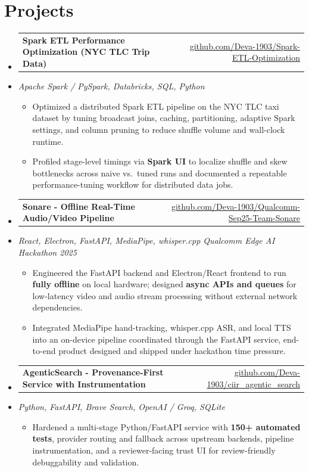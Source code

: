\documentclass[letterpaper,10pt]{article}
\makeatletter
\newcommand{\resumeItem}[1]{
  \item\small{#1\vspace{-1pt}}
}
\newcommand{\resumeProjectHeading}[2]{
    \item
    \begin{tabular*}{0.985\textwidth}[t]{l@{\extracolsep{\fill}}r}
      \small\textbf{#1} & \small #2 \\
    \end{tabular*}\vspace{-5pt}
}
\newcommand{\resumeProjectSubheading}[1]{
  \vspace{-2pt}\item[] {\small\textcolor{ResumeSlate}{\emph{#1}}}\vspace{-3pt}
}
\newcommand{\resumeSubHeadingListStart}{\begin{itemize}[leftmargin=0.0in, label={}, itemsep=2pt, topsep=2pt]}
\newcommand{\resumeSubHeadingListEnd}{\end{itemize}}
\newcommand{\resumeItemListStart}{\begin{itemize}[leftmargin=0.18in, itemsep=2pt, topsep=1pt]}
\newcommand{\resumeItemListEnd}{\end{itemize}\vspace{-4pt}}
\makeatother
\begin{document}
\section{Projects}
\resumeSubHeadingListStart
  \resumeProjectHeading
    {Spark ETL Performance Optimization (NYC TLC Trip Data)}
    {\href{https://github.com/Deva-1903/Spark-ETL-Optimization}{github.com/Deva-1903/Spark-ETL-Optimization}}
  \resumeProjectSubheading{Apache Spark / PySpark, Databricks, SQL, Python}
    \resumeItemListStart
      \resumeItem{Optimized a distributed Spark ETL pipeline on the NYC TLC taxi dataset by tuning broadcast joins, caching, partitioning, adaptive Spark settings, and column pruning to reduce shuffle volume and wall-clock runtime.}
      \resumeItem{Profiled stage-level timings via \textbf{Spark UI} to localize shuffle and skew bottlenecks across naive vs.\ tuned runs and documented a repeatable performance-tuning workflow for distributed data jobs.}
    \resumeItemListEnd
  \resumeProjectHeading
    {Sonare - Offline Real-Time Audio/Video Pipeline}
    {\href{https://github.com/Deva-1903/Qualcomm-Sep25-Team-Sonare}{github.com/Deva-1903/Qualcomm-Sep25-Team-Sonare}}
  \resumeProjectSubheading{React, Electron, FastAPI, MediaPipe, whisper.cpp \enspace\textbar\enspace Qualcomm Edge AI Hackathon 2025}
    \resumeItemListStart
      \resumeItem{Engineered the FastAPI backend and Electron/React frontend to run \textbf{fully offline} on local hardware; designed \textbf{async APIs and queues} for low-latency video and audio stream processing without external network dependencies.}
      \resumeItem{Integrated MediaPipe hand-tracking, whisper.cpp ASR, and local TTS into an on-device pipeline coordinated through the FastAPI service, end-to-end product designed and shipped under hackathon time pressure.}
    \resumeItemListEnd
  \resumeProjectHeading
    {AgenticSearch - Provenance-First Service with Instrumentation}
    {\href{https://github.com/Deva-1903/ciir_agentic_search}{github.com/Deva-1903/ciir\_agentic\_search}}
  \resumeProjectSubheading{Python, FastAPI, Brave Search, OpenAI / Groq, SQLite}
    \resumeItemListStart
      \resumeItem{Hardened a multi-stage Python/FastAPI service with \textbf{150+ automated tests}, provider routing and fallback across upstream backends, pipeline instrumentation, and a reviewer-facing trust UI for review-friendly debuggability and validation.}
    \resumeItemListEnd
\resumeSubHeadingListEnd
\vspace{-4pt}
\end{document}
